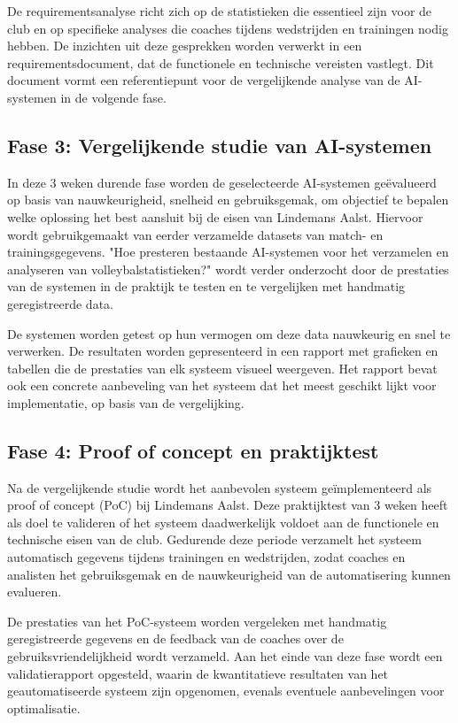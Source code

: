 De requirementsanalyse richt zich op de statistieken die essentieel zijn voor de club en op specifieke analyses die coaches tijdens wedstrijden en trainingen nodig hebben. De inzichten uit deze gesprekken worden verwerkt in een requirementsdocument, dat de functionele en technische vereisten vastlegt. Dit document vormt een referentiepunt voor de vergelijkende analyse van de AI-systemen in de volgende fase.
\subsection{Fase 3: Vergelijkende studie van AI-systemen}
In deze 3 weken durende fase worden de geselecteerde AI-systemen geëvalueerd op basis van nauwkeurigheid, snelheid en gebruiksgemak, om objectief te bepalen welke oplossing het best aansluit bij de eisen van Lindemans Aalst. Hiervoor wordt gebruikgemaakt van eerder verzamelde datasets van match- en trainingsgegevens. "Hoe presteren bestaande AI-systemen voor het verzamelen en analyseren van volleybalstatistieken?" wordt verder onderzocht door de prestaties van de systemen in de praktijk te testen en te vergelijken met handmatig geregistreerde data.

De systemen worden getest op hun vermogen om deze data nauwkeurig en snel te verwerken. De resultaten worden gepresenteerd in een rapport met grafieken en tabellen die de prestaties van elk systeem visueel weergeven. Het rapport bevat ook een concrete aanbeveling van het systeem dat het meest geschikt lijkt voor implementatie, op basis van de vergelijking.
\subsection{Fase 4: Proof of concept en praktijktest}
Na de vergelijkende studie wordt het aanbevolen systeem geïmplementeerd als proof of concept (PoC) bij Lindemans Aalst. Deze praktijktest van 3 weken heeft als doel te valideren of het systeem daadwerkelijk voldoet aan de functionele en technische eisen van de club. Gedurende deze periode verzamelt het systeem automatisch gegevens tijdens trainingen en wedstrijden, zodat coaches en analisten het gebruiksgemak en de nauwkeurigheid van de automatisering kunnen evalueren.

De prestaties van het PoC-systeem worden vergeleken met handmatig geregistreerde gegevens en de feedback van de coaches over de gebruiksvriendelijkheid wordt verzameld. Aan het einde van deze fase wordt een validatierapport opgesteld, waarin de kwantitatieve resultaten van het geautomatiseerde systeem zijn opgenomen, evenals eventuele aanbevelingen voor optimalisatie.
